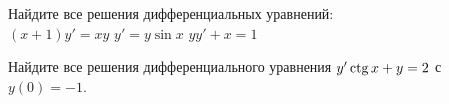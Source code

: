 \documentclass[a4paper, 12pt]{article}
\begin{document}
  Найдите все решения дифференциальных уравнений:
  \\
  $(x+1)y'=xy$\qquad
  $y'=y\sin x$\qquad
  $yy'+x=1$














  Найдите все решения дифференциального уравнения
  $y'\ctg x+y=2$ с $y(0)=-1$.



















\end{document}
